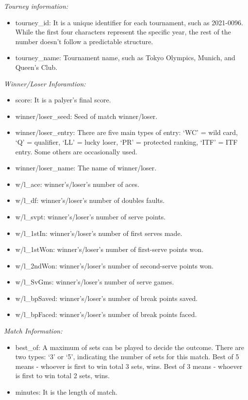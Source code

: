 \documentclass[
]{article}
\providecommand{\tightlist}{%
  \setlength{\itemsep}{0pt}\setlength{\parskip}{0pt}}
\begin{document}
\emph{Tourney information:}

\begin{itemize}
\tightlist
\item
  tourney\_id: It is a unique identifier for each tournament, such as
  2021-0096. While the first four characters represent the specific
  year, the rest of the number doesn't follow a predictable structure.
\item
  tourney\_name: Tournament name, such as Tokyo Olympics, Munich, and
  Queen's Club.
\end{itemize}

\emph{Winner/Loser Inforamtion:}

\begin{itemize}
\tightlist
\item
  score: It is a palyer's final score.
\item
  winner/loser\_seed: Seed of match winner/loser.
\item
  winner/loser\_entry: There are five main types of entry: `WC' = wild
  card, `Q' = qualifier, `LL' = lucky loser, `PR' = protected ranking,
  `ITF' = ITF entry. Some others are occasionally used.
\item
  winner/loser\_name: The name of winner/loser.
\item
  w/l\_ace: winner's/loser's number of aces.
\item
  w/l\_df: winner's/loser's number of doubles faults.
\item
  w/l\_svpt: winner's/loser's number of serve points.
\item
  w/l\_1stIn: winner's/loser's number of first serves made.
\item
  w/l\_1stWon: winner's/loser's number of first-serve points won.
\item
  w/l\_2ndWon: winner's/loser's number of second-serve points won.
\item
  w/l\_SvGms: winner's/loser's number of serve games.
\item
  w/l\_bpSaved: winner's/loser's number of break points saved.
\item
  w/l\_bpFaced: winner's/loser's number of break points faced.
\end{itemize}

\emph{Match Information:}

\begin{itemize}
\tightlist
\item
  best\_of: A maximum of sets can be played to decide the outcome. There
  are two types: `3' or `5', indicating the number of sets for this
  match. Best of 5 means - whoever is first to win total 3 sets, wins.
  Best of 3 means - whoever is first to win total 2 sets, wins.
\item
  minutes: It is the length of match.
\end{itemize}
\end{document}
